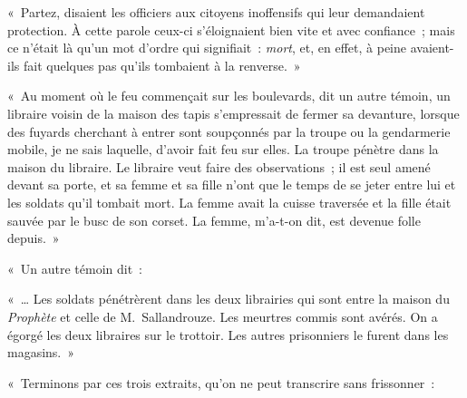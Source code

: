\documentclass[french,twoside]{book} %
\newcommand{\astertri}{\medskip\par\centerline{\color{rubric}\large\selectfont{\syms ✻\,✻\,✻}}\medskip\par}%
\newenvironment{quoteblock}%
  {\begin{quoting}}
  {\end{quoting}}
\newenvironment{quotebar}{%
    \def\FrameCommand{{\color{rubric!10!}\vrule width 0.5em} \hspace{0.9em}}%
    \def\OuterFrameSep{0pt} %
    \MakeFramed {\advance\hsize-\width \FrameRestore}
  }%
  {%
    \endMakeFramed
  }
\renewenvironment{quoteblock}%
  {%
    \savenotes
    \setstretch{0.9}
    \begin{quotebar}
    \smallskip
  }
  {%
    \smallskip
    \end{quotebar}
    \spewnotes
  }
\begin{document}
\astertri


\begin{quoteblock}
 \noindent « Partez, disaient les officiers aux citoyens inoffensifs qui leur demandaient protection. À cette parole ceux-ci s’éloignaient bien vite et avec confiance ; mais ce n’était là qu’un mot d’ordre qui signifiait : \emph{mort}, et, en effet, à peine avaient-ils fait quelques pas qu’ils tombaient à la renverse. »\par
 « Au moment où le feu commençait sur les boulevards, dit un autre témoin, un libraire voisin de la maison des tapis s’empressait de fermer sa devanture, lorsque des fuyards cherchant à entrer sont soupçonnés par la troupe ou la gendarmerie mobile, je ne sais laquelle, d’avoir fait feu sur elles. La troupe pénètre dans la maison du libraire. Le libraire veut faire des observations ; il est seul amené devant sa porte, et sa femme et sa fille n’ont que le temps de se jeter entre lui et les soldats qu’il tombait mort. La femme avait la cuisse traversée et la fille était sauvée par le busc de son corset. La femme, m’a-t-on dit, est devenue folle depuis. »
 \end{quoteblock}

« Un autre témoin dit :\par

\begin{quoteblock}
 \noindent « … Les soldats pénétrèrent dans les deux librairies qui sont entre la maison du \emph{Prophète} et celle de M. Sallandrouze. Les meurtres commis sont avérés. On a égorgé les deux libraires sur le trottoir. Les autres prisonniers le furent dans les magasins. »
 \end{quoteblock}

« Terminons par ces trois extraits, qu’on ne peut transcrire sans frissonner :\par
\end{document}
